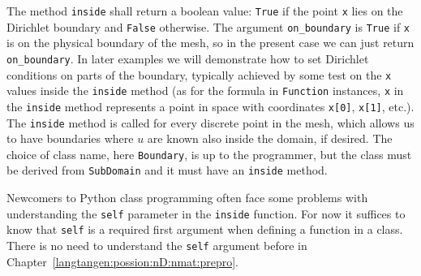 \noindent
The method {\fontsize{12pt}{12pt}\verb!inside!} shall return
a boolean value: {\fontsize{12pt}{12pt}\verb!True!} if the point
{\fontsize{12pt}{12pt}\verb!x!} lies on the Dirichlet boundary and 
{\fontsize{12pt}{12pt}\verb!False!} otherwise.
The argument {\fontsize{12pt}{12pt}\verb!on_boundary!} is {\fontsize{12pt}{12pt}\verb!True!} if {\fontsize{12pt}{12pt}\verb!x!} is on
the physical boundary of the mesh, so in the present case we can just return
{\fontsize{12pt}{12pt}\verb!on_boundary!}. In later examples we will demonstrate how to set
Dirichlet conditions on parts of the boundary, typically achieved by some
test on the {\fontsize{12pt}{12pt}\verb!x!} values inside the {\fontsize{12pt}{12pt}\verb!inside!} method
(as for the formula in {\fontsize{12pt}{12pt}\verb!Function!} instances, {\fontsize{12pt}{12pt}\verb!x!} in the
{\fontsize{12pt}{12pt}\verb!inside!} method represents a point in space with
coordinates {\fontsize{12pt}{12pt}\texttt{x[0]}}, {\fontsize{12pt}{12pt}\texttt{x[1]}}, etc.).
The {\fontsize{12pt}{12pt}\verb!inside!} method is called
for every discrete point in the mesh, which allows us to have boundaries
where $u$ are known also inside the domain, if desired.
The choice of class name, here {\fontsize{12pt}{12pt}\verb!Boundary!}, is up to the programmer,
but the class must be derived from {\fontsize{12pt}{12pt}\verb!SubDomain!} and it must have
an {\fontsize{12pt}{12pt}\verb!inside!} method.

Newcomers to Python class programming often face some problems with
understanding the {\fontsize{12pt}{12pt}\texttt{self}} parameter in the {\fontsize{12pt}{12pt}\texttt{inside}} function.
For now it suffices to know that {\fontsize{12pt}{12pt}\texttt{self}} is a required first argument
when defining a function in a class. There is no need to understand
the {\fontsize{12pt}{12pt}\texttt{self}} argument before in Chapter~\ref{langtangen:possion:nD:nmat:prepro}.


